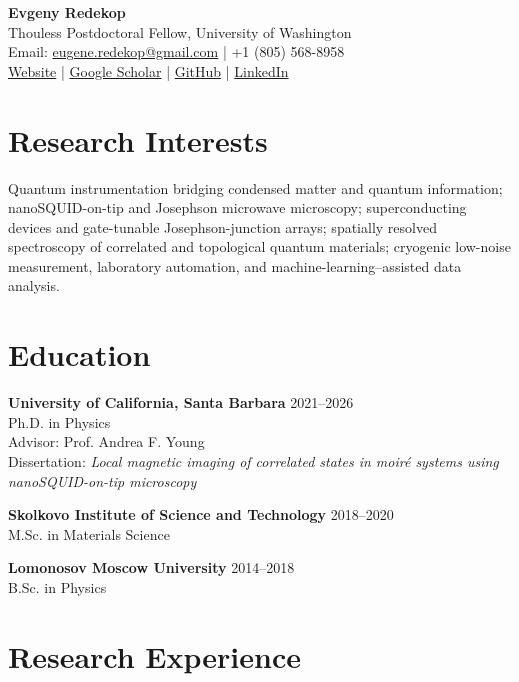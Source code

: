 \documentclass[11pt]{article}
\begin{document}
\begin{center}
    {\LARGE \textbf{Evgeny Redekop}} \\
    Thouless Postdoctoral Fellow, University of Washington \\
    Email: \href{mailto:eugene.redekop@gmail.com}{eugene.redekop@gmail.com} \quad | \quad +1 (805) 568-8958 \\
    \href{https://evgeny-redekop.github.io}{Website} \quad | \quad \href{https://scholar.google.com/citations?hl=en&user=eXBKws4AAAAJ}{Google Scholar} \quad | \quad \href{https://github.com/evgeny-redekop}{GitHub} \quad | \quad \href{https://www.linkedin.com/in/evgeny-redekop/}{LinkedIn}
\end{center}

\section*{Research Interests}
Quantum instrumentation bridging condensed matter and quantum information; nanoSQUID-on-tip and Josephson microwave microscopy; superconducting devices and gate-tunable Josephson-junction arrays; spatially resolved spectroscopy of correlated and topological quantum materials; cryogenic low-noise measurement, laboratory automation, and machine-learning--assisted data analysis.

\section*{Education}
\textbf{University of California, Santa Barbara} \hfill 2021--2026\\
Ph.D. in Physics\\
Advisor: Prof. Andrea F. Young\\
Dissertation: \emph{Local magnetic imaging of correlated states in moir\'e systems using nanoSQUID-on-tip microscopy}

\vspace{0.3em}
\textbf{Skolkovo Institute of Science and Technology} \hfill 2018--2020\\
M.Sc. in Materials Science

\vspace{0.3em}
\textbf{Lomonosov Moscow University} \hfill 2014--2018\\
B.Sc. in Physics

\section*{Research Experience}
\end{document}
